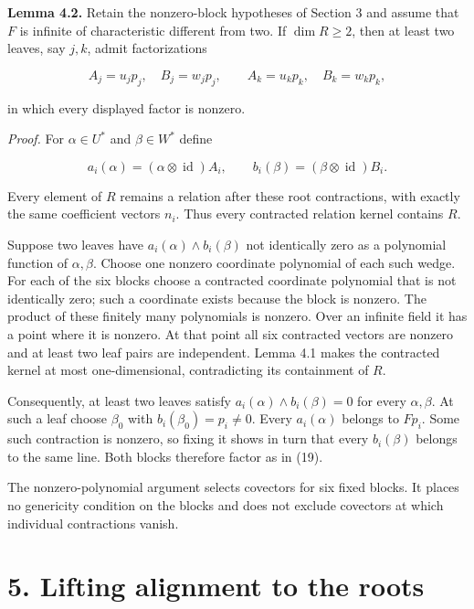 \documentclass[11pt]{article}
\begin{document}
\textbf{Lemma 4.2.} Retain the nonzero-block hypotheses of Section 3 and assume that $F$ is infinite of characteristic different from two. If $\dim R\geq2$, then at least two leaves, say $j,k$, admit factorizations


\nopagebreak[4]

\begin{equation}
A_j=u_jp_j,\quad B_j=w_jp_j,\qquad
A_k=u_kp_k,\quad B_k=w_kp_k,
\tag{19}
\end{equation}

in which every displayed factor is nonzero.


\emph{Proof.} For $\alpha\in U^*$ and $\beta\in W^*$ define


\nopagebreak[4]

\begin{equation}
a_i(\alpha)=(\alpha\otimes\operatorname{id})A_i,\qquad
b_i(\beta)=(\beta\otimes\operatorname{id})B_i.
\tag{20}
\end{equation}

Every element of $R$ remains a relation after these root contractions, with exactly the same coefficient vectors $n_i$. Thus every contracted relation kernel contains $R$.


Suppose two leaves have $a_i(\alpha)\wedge b_i(\beta)$ not identically zero as a polynomial function of $\alpha,\beta$. Choose one nonzero coordinate polynomial of each such wedge. For each of the six blocks choose a contracted coordinate polynomial that is not identically zero; such a coordinate exists because the block is nonzero. The product of these finitely many polynomials is nonzero. Over an infinite field it has a point where it is nonzero. At that point all six contracted vectors are nonzero and at least two leaf pairs are independent. Lemma 4.1 makes the contracted kernel at most one-dimensional, contradicting its containment of $R$.


Consequently, at least two leaves satisfy $a_i(\alpha)\wedge b_i(\beta)=0$ for every $\alpha,\beta$. At such a leaf choose $\beta_0$ with $b_i(\beta_0)=p_i\ne0$. Every $a_i(\alpha)$ belongs to $F p_i$. Some such contraction is nonzero, so fixing it shows in turn that every $b_i(\beta)$ belongs to the same line. Both blocks therefore factor as in (19).


The nonzero-polynomial argument selects covectors for six fixed blocks. It places no genericity condition on the blocks and does not exclude covectors at which individual contractions vanish.


\section*{5. Lifting alignment to the roots}
\end{document}
